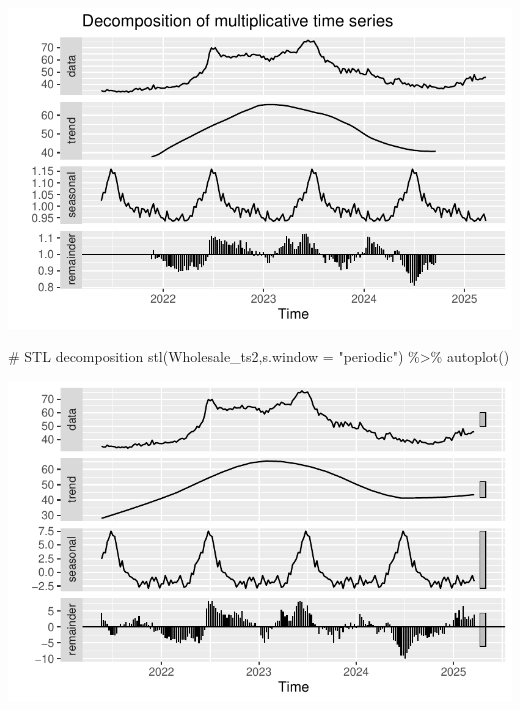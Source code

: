 \documentclass[
  letterpaper,
  DIV=11,
  numbers=noendperiod]{scrartcl}
\newenvironment{Shaded}{\begin{snugshade}}{\end{snugshade}}
\newcommand{\AttributeTok}[1]{\textcolor[rgb]{0.40,0.45,0.13}{#1}}
\newcommand{\CommentTok}[1]{\textcolor[rgb]{0.37,0.37,0.37}{#1}}
\newcommand{\FunctionTok}[1]{\textcolor[rgb]{0.28,0.35,0.67}{#1}}
\newcommand{\NormalTok}[1]{\textcolor[rgb]{0.00,0.23,0.31}{#1}}
\newcommand{\SpecialCharTok}[1]{\textcolor[rgb]{0.37,0.37,0.37}{#1}}
\newcommand{\StringTok}[1]{\textcolor[rgb]{0.13,0.47,0.30}{#1}}
\begin{document}
\includegraphics{Maize_analysis_files/figure-pdf/unnamed-chunk-24-1.pdf}

\begin{Shaded}
\begin{Highlighting}[]
\CommentTok{\# STL decomposition}
\FunctionTok{stl}\NormalTok{(Wholesale\_ts2,}\AttributeTok{s.window =} \StringTok{"periodic"}\NormalTok{) }\SpecialCharTok{\%\textgreater{}\%} \FunctionTok{autoplot}\NormalTok{()}
\end{Highlighting}
\end{Shaded}

\includegraphics{Maize_analysis_files/figure-pdf/unnamed-chunk-25-1.pdf}
\end{document}
